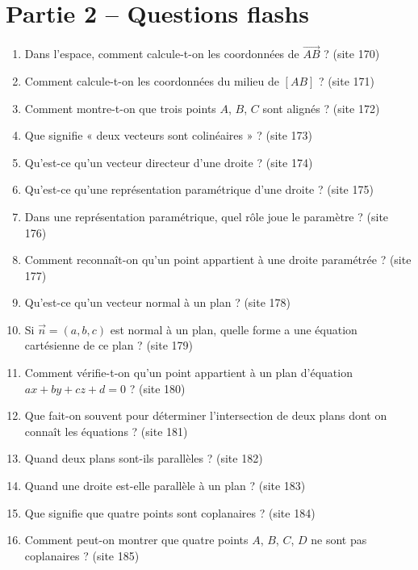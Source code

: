 \documentclass[11pt,a4paper]{article}
\newcommand{\origine}[1]{ {\scriptsize\textcolor{bleufonce}{(site #1)}}}
\newcounter{question}
\newenvironment{blocquestions}[1]{%
  \begin{tcolorbox}[
    enhanced,
    breakable,
    colback=bleuclair,
    colframe=bleufonce,
    coltitle=white,
    colbacktitle=bleufonce,
    title={\bfseries #1},
    fonttitle=\bfseries,
    boxrule=0.6pt,
    arc=2mm,
    left=2mm,
    right=2mm,
    top=2.5mm,
    bottom=1.5mm,
    toptitle=1.2mm,
    bottomtitle=1.2mm,
    lefttitle=2mm,
    righttitle=2mm,
    before upper=\vspace{0.7mm},
    before skip=3.5mm,
    after skip=3mm, fontupper=\large
  ]
  \large
  \begin{enumerate}[leftmargin=*,label=\textbf{\arabic*.},itemsep=0.85em,topsep=0.5em]
  \setcounter{enumi}{\value{question}}
}{%
  \setcounter{question}{\value{enumi}}
  \end{enumerate}
  \end{tcolorbox}
}
\begin{document}
\section*{Partie 2 -- Questions flashs}
\setcounter{question}{0}
\begin{blocquestions}{A. Repères, vecteurs, droites et plans}
  \item Dans l'espace, comment calcule-t-on les coordonnées de $\overrightarrow{AB}$ ? \origine{170}
  \item Comment calcule-t-on les coordonnées du milieu de $[AB]$ ? \origine{171}
  \item Comment montre-t-on que trois points $A$, $B$, $C$ sont alignés ? \origine{172}
  \item Que signifie « deux vecteurs sont colinéaires » ? \origine{173}
  \item Qu'est-ce qu'un vecteur directeur d'une droite ? \origine{174}
  \item Qu'est-ce qu'une représentation paramétrique d'une droite ? \origine{175}
  \item Dans une représentation paramétrique, quel rôle joue le paramètre ? \origine{176}
  \item Comment reconnaît-on qu'un point appartient à une droite paramétrée ? \origine{177}
  \item Qu'est-ce qu'un vecteur normal à un plan ? \origine{178}
  \item Si $\vec n=(a,b,c)$ est normal à un plan, quelle forme a une équation cartésienne de ce plan ? \origine{179}
  \item Comment vérifie-t-on qu'un point appartient à un plan d'équation $ax+by+cz+d=0$ ? \origine{180}
  \item Que fait-on souvent pour déterminer l'intersection de deux plans dont on connaît les équations ? \origine{181}
  \item Quand deux plans sont-ils parallèles ? \origine{182}
  \item Quand une droite est-elle parallèle à un plan ? \origine{183}
  \item Que signifie que quatre points sont coplanaires ? \origine{184}
  \item Comment peut-on montrer que quatre points $A$, $B$, $C$, $D$ ne sont pas coplanaires ? \origine{185}
\end{blocquestions}
\end{document}
